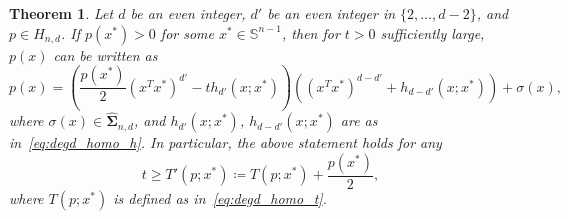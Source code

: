 \documentclass[12pt]{article}
\newcommand{\HSOS}{\widehat{\mathbf{\Sigma}}}
\newcommand{\defeq}{\coloneq}
\newcommand{\mbS}{\mathbb{S}}
\newtheorem{theorem}{Theorem}%
\newtheorem{lemma}[theorem]{Lemma}  %
\theoremstyle{remark}
\begin{document}
\begin{theorem}\label{thm:degd_homo_d'}
Let $d$ be an even integer, $d'$ be an even integer in $\{2,\ldots,d-2\}$, and $p\in H_{n,d}$. 
If $p(x^*)>0$ for some $x^*\in \mbS^{n-1}$, then for $t>0$ sufficiently large, $p(x)$ can be written as
\begin{equation*}
    p(x)=\left(\frac{p(x^*)}{2}(x^Tx^*)^{d'}-th_{d'}(x;x^*)\right)\left((x^Tx^*)^{d-d'}+h_{d-d'}(x;x^*)\right)+\sigma(x),
\end{equation*}
where $\sigma(x)\in\HSOS_{n,d}$, and $h_{d'}(x;x^*)$, $h_{d-d'}(x;x^*)$ are as in~\eqref{eq:degd_homo_h}. In particular, the above statement holds for any
\[t\ge T'(p;x^*)\defeq T(p;x^*) + \frac{p(x^*)}{2},\]
where $T(p;x^*)$ is defined as in~\eqref{eq:degd_homo_t}. 
\end{theorem}






\end{document}
